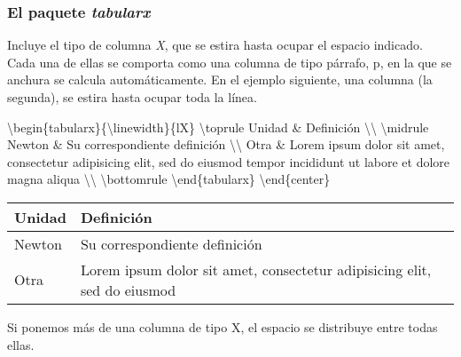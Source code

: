 \documentclass[11pt]{article}
\newenvironment{Shaded}{}{}
\newcommand{\NormalTok}[1]{{#1}}
\begin{document}
\subsubsection{El paquete \emph{tabularx}}\label{el-paquete-tabularx}

Incluye el tipo de columna \emph{X}, que se estira hasta ocupar el
espacio indicado. Cada una de ellas se comporta como una columna de tipo párrafo, p, en la que se anchura se calcula automáticamente. En el ejemplo siguiente, una columna (la segunda), se estira hasta ocupar toda la línea.

\begin{Shaded}
\begin{Highlighting}[]
\NormalTok{\textbackslash{}begin\{tabularx\}\{\textbackslash{}linewidth\}\{lX\}}
\NormalTok{\textbackslash{}toprule}
 \NormalTok{Unidad & Definición \textbackslash{}\textbackslash{}}
 \NormalTok{\textbackslash{}midrule}
 \NormalTok{Newton & Su correspondiente definición  \textbackslash{}\textbackslash{}}
 \NormalTok{Otra &  Lorem ipsum dolor sit amet, consectetur adipisicing elit, sed do eiusmod tempor incididunt ut labore et dolore magna aliqua  \textbackslash{}\textbackslash{}}
 \NormalTok{\textbackslash{}bottomrule}
\NormalTok{\textbackslash{}end\{tabularx\}}
\NormalTok{\textbackslash{}end\{center\}}
\end{Highlighting}
\end{Shaded}

\begin{center}
\begin{tabularx}{\linewidth}{lX}
\toprule
 Unidad & Definición \\
 \midrule
 Newton & Su correspondiente definición  \\
 Otra &  Lorem ipsum dolor sit amet, consectetur adipisicing elit, sed do eiusmod\\
 \bottomrule
\end{tabularx}
\end{center}

Si ponemos más de una columna de tipo X, el espacio se distribuye entre
todas ellas.
\end{document}

